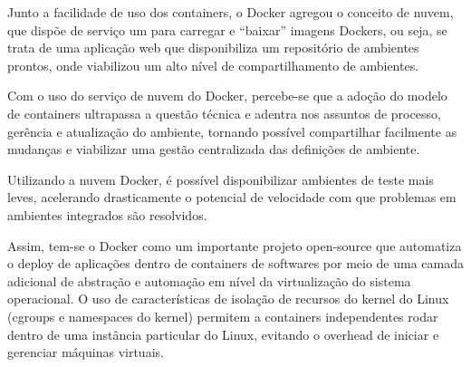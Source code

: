 Junto a facilidade de uso dos containers, o Docker agregou o conceito de nuvem, que dispõe de serviço um para carregar e “baixar” imagens Dockers, ou seja, se trata de uma aplicação web que disponibiliza um repositório de ambientes prontos, onde viabilizou um alto nível de compartilhamento de ambientes.

Com o uso do serviço de nuvem do Docker, percebe-se que a adoção do modelo de containers ultrapassa a questão técnica e adentra nos assuntos de processo, gerência e atualização do ambiente, tornando possível compartilhar facilmente as mudanças e viabilizar uma gestão centralizada das definições de ambiente.

Utilizando a nuvem Docker, é possível disponibilizar ambientes de teste mais leves, acelerando drasticamente o potencial de velocidade com que problemas em ambientes integrados são resolvidos.

Assim, tem-se o Docker como um importante projeto open-source que automatiza o deploy de aplicações dentro de containers de softwares por meio de uma camada adicional de abstração e automação em nível da virtualização do sistema operacional. O uso de características de isolação de recursos do kernel do Linux (cgroups e namespaces do kernel) permitem a containers independentes rodar dentro de uma instância particular do Linux, evitando o overhead de iniciar e gerenciar máquinas virtuais.
